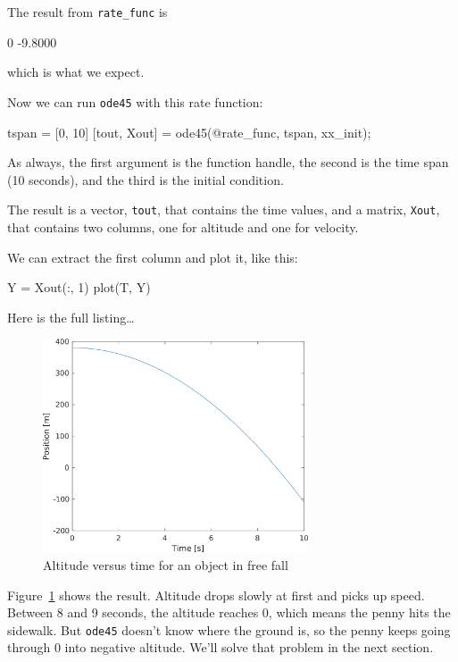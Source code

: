 
The result from \lstinline{rate_func} is

\begin{code}
    0
   -9.8000
\end{code}
which is what we expect.

Now we can run \lstinline{ode45} with this rate function:

\begin{code}
tspan = [0, 10]
[tout, Xout] = ode45(@rate_func, tspan, xx_init);
\end{code}

As always, the first argument is the function handle, the second is the time span (10 seconds), and the third is the initial condition.

The result is a vector, \lstinline{tout}, that contains the time values, and a matrix, \lstinline{Xout}, that contains two columns, one for altitude and one for velocity.

We can extract the first column and plot it, like this:

\begin{code}
Y = Xout(:, 1)
plot(T, Y)
\end{code}

Here is the full listing\dots


\begin{figure}
\centerline{\includegraphics[width=0.7\textwidth]{../code/chap_secondordersystems/penny1.png}}
\caption{Altitude versus time for an object in free fall}
\label{fig:penny}
\end{figure}

Figure~\ref{fig:penny} shows the result.  Altitude drops slowly at first and picks up speed.  Between 8 and 9 seconds, the altitude reaches 0, which means the penny hits the sidewalk.  But \lstinline{ode45} doesn't know where the ground is, so  the penny keeps going through 0 into negative altitude.  We'll solve that problem in the next section.

